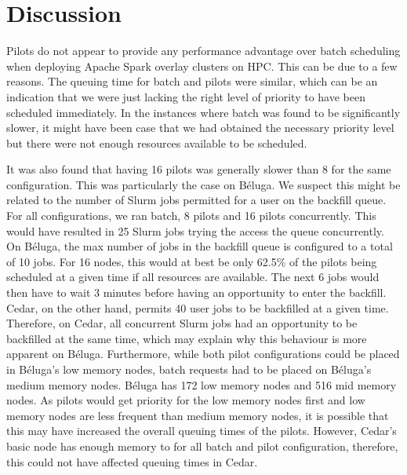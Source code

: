     \section{Discussion}\label{spa:sec:discussion}
    
    
    Pilots do not appear to provide any performance advantage over batch
    scheduling when deploying Apache Spark overlay clusters on HPC. This can be
    due to a few reasons. The queuing time for batch and pilots were similar,
    which can be an indication that we were just lacking the right level of
    priority to have been scheduled immediately. In the instances where batch
    was found to be significantly slower, it might have been case that we had
    obtained the necessary priority level but there were not enough resources
    available to be scheduled.
    
    It was also found that having 16 pilots was generally slower than 8 for the
    same configuration. This was particularly the case on B\'eluga. We suspect
    this might be related to the number of Slurm jobs permitted for a user on
    the backfill queue. For all configurations, we ran batch, 8 pilots and 16
    pilots concurrently. This would have resulted in 25 Slurm jobs trying the
    access the queue concurrently. On B\'eluga, the max number of jobs in the
    backfill queue is configured to a total of 10 jobs. For 16 nodes, this would
    at best be only 62.5\% of the pilots being scheduled at a given time if all
    resources are available. The next 6 jobs would then have to wait 3 minutes
    before having an opportunity to enter the backfill. Cedar, on the other
    hand, permits 40 user jobs to be backfilled at a given time. Therefore, on
    Cedar, all concurrent Slurm jobs had an opportunity to be backfilled at the
    same time, which may explain why this behaviour is more apparent on
    B\'eluga. Furthermore, while both pilot configurations could be placed in
    B\'eluga's low memory nodes, batch requests had to be placed on B\'eluga's
    medium memory nodes. B\'eluga has 172 low memory nodes and 516 mid memory
    nodes. As pilots would get priority for the low memory nodes first and low
    memory nodes are less frequent than medium memory nodes, it is possible that
    this may have increased the overall queuing times of the pilots. However,
    Cedar's basic node has enough memory to for all batch and pilot
    configuration, therefore, this could not have affected queuing times in
    Cedar.
    
